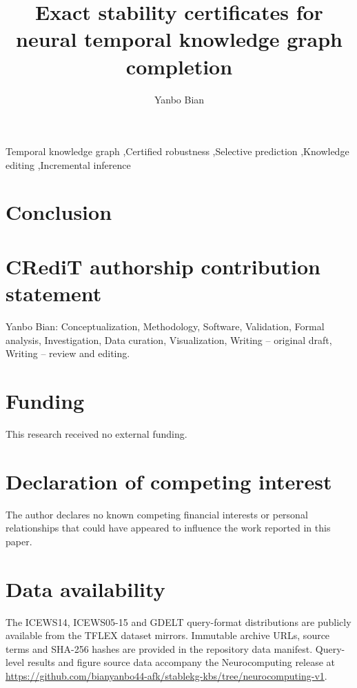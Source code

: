 \documentclass[5p,twocolumn]{elsarticle}
\begin{document}
\hypersetup{allcolors=black}
\raggedbottom
\begin{frontmatter}
\title{Exact stability certificates for neural temporal knowledge graph completion}
\author[inst]{Yanbo Bian}
\begin{abstract}

\end{abstract}
\begin{keyword}
Temporal knowledge graph \sep Certified robustness \sep Selective prediction \sep Knowledge editing \sep Incremental inference
\end{keyword}
\end{frontmatter}





\section{Conclusion}

\FloatBarrier
\section*{CRediT authorship contribution statement}
Yanbo Bian: Conceptualization, Methodology, Software, Validation, Formal analysis, Investigation, Data curation, Visualization, Writing -- original draft, Writing -- review and editing.
\section*{Funding}
This research received no external funding.
\section*{Declaration of competing interest}
The author declares no known competing financial interests or personal relationships that could have appeared to influence the work reported in this paper.
\section*{Data availability}
The ICEWS14, ICEWS05-15 and GDELT query-format distributions are publicly available from the TFLEX dataset mirrors. Immutable archive URLs, source terms and SHA-256 hashes are provided in the repository data manifest. Query-level results and figure source data accompany the Neurocomputing release at \url{https://github.com/bianyanbo44-afk/stablekg-kbs/tree/neurocomputing-v1}.
\end{document}
